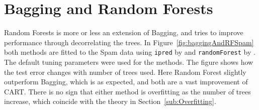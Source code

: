 \section{Bagging and Random Forests}
\label{sec:BaggandRFSim}
Random Forests is more or less an extension of Bagging, and tries to improve performance through decorrelating the trees. In Figure~\ref{fig:baggingAndRFSpam} both methods are fitted to the Spam data using \verb+ipred+ by \cite{ipred} and \verb+randomForest+ by \cite{randomForestR}. The default tuning parameters were used for the methods. The figure shows how the test error changes with number of trees used. Here Random Forest slightly outperform Bagging, which is as expected, and both are a vast improvement of CART. There is no sign that either method is overfitting as the number of trees increase, which coincide with the theory in Section~\ref{sub:Overfitting}.
\\
